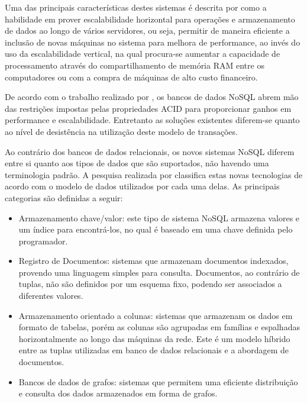 Uma das principais características destes sistemas é descrita por  como a habilidade em prover escalabilidade horizontal para operações e armazenamento de dados ao longo de vários servidores, ou seja, permitir de maneira eficiente a inclusão de novas máquinas no sistema para melhora de performance, ao invés do uso da escalabilidade vertical, na qual procura-se aumentar a capacidade de processamento através do compartilhamento de memória RAM entre os computadores ou com a compra de máquinas de alto custo financeiro.

De acordo com o trabalho realizado por , os bancos de dados NoSQL abrem mão das restrições impostas pelas propriedades ACID para proporcionar ganhos em performance e escalabilidade. Entretanto as soluções existentes diferem-se quanto ao nível de desistência na utilização deste modelo de transações.

Ao contrário dos bancos de dados relacionais, os novos sistemas NoSQL diferem entre si quanto aos tipos de dados que são suportados, não havendo uma terminologia padrão. A pesquisa realizada por  classifica estas novas tecnologias de acordo com o modelo de dados utilizados por cada uma delas. As principais categorias são definidas a seguir:

\begin{itemize}

  \item{Armazenamento chave/valor: este tipo de sistema NoSQL armazena valores e um índice para encontrá-los, no qual é baseado em uma chave definida pelo programador.}
  \item{Registro de Documentos: sistemas que armazenam documentos indexados, provendo uma linguagem simples para consulta. Documentos, ao contrário de tuplas, não são definidos por um esquema fixo, podendo ser associados a diferentes valores.}
  \item{Armazenamento orientado a colunas: sistemas que armazenam os dados em formato de tabelas, porém as colunas são agrupadas em famílias e espalhadas horizontalmente ao longo das máquinas da rede. Este é um modelo híbrido entre as tuplas utilizadas em banco de dados relacionais e a abordagem de documentos.}
  \item{Bancos de dados de grafos: sistemas que permitem uma eficiente distribuição e consulta dos dados armazenados em forma de grafos.}

\end{itemize}


